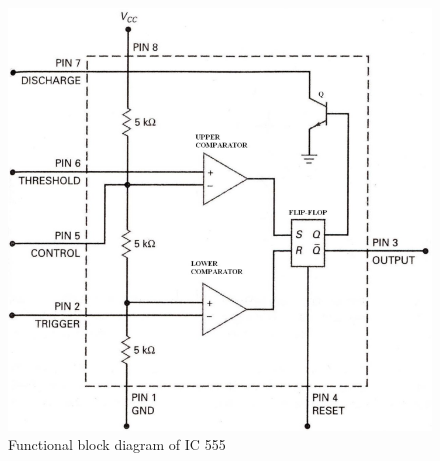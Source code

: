 \begin{figure}[H]
    \centering
    \includegraphics[width=0.90\columnwidth]{images/555a.png}
    \caption{Functional block diagram of IC 555}
    \label{fig:0}
\end{figure}

